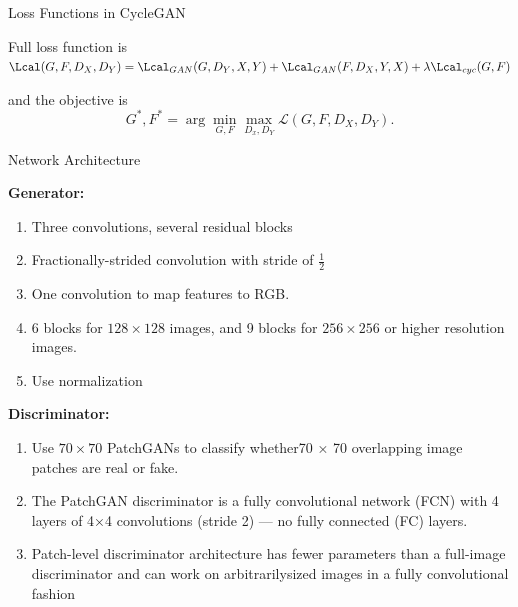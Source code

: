 \documentclass[aspectratio=169,xcolor=dvipsnames,svgnames,x11names,fleqn]{beamer}
\begin{document}
\begin{frame}{Loss Functions in CycleGAN}
    \begin{tcolorbox}[finalbox]
        \scriptsize
        Full loss function is $
        \Lcal(G, F, D_X, D_Y) = \Lcal_{GAN}(G, D_Y, X, Y) + \Lcal_{GAN}(F, D_X, Y, X) + \lambda \Lcal_{cyc}(G, F) $
        
        and the objective is 
        \begin{equation*}
        G^{*}, F^{*} = \arg\min_{G,F} \max_{D_{x},D_{Y}} \mathcal{L}(G, F, D_{X}, D_{Y}).
        \end{equation*}
    \end{tcolorbox}
\end{frame}


\begin{frame}{Network Architecture}

\footnotesize

\textbf{Generator:}

\begin{enumerate}
\item Three convolutions, several residual blocks
\item Fractionally-strided convolution with stride of $\frac{1}{2}$
\item One convolution to map features to RGB.
\item 6 blocks for $128 \times 128$ images, and 9 blocks for $256\times 256$ or higher resolution images.
\item Use normalization
\end{enumerate}

\textbf{Discriminator:}
\begin{enumerate}
\item Use $70\times 70$ PatchGANs to classify whether70 × 70 overlapping image patches are real or fake.
\item The PatchGAN discriminator is a fully convolutional network (FCN) with 4 layers of 4×4 convolutions (stride 2) — no fully connected (FC) layers.
\item Patch-level discriminator architecture has fewer parameters than a full-image discriminator and can work on arbitrarilysized images in a fully convolutional fashion
\end{enumerate}

\end{frame}
\end{document}
